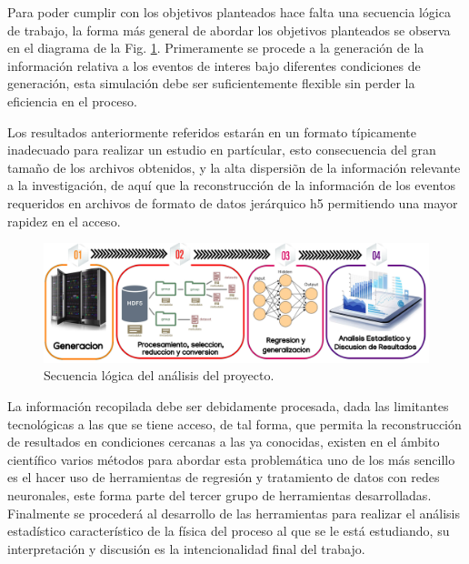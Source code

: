 Para poder cumplir con los objetivos planteados hace falta una secuencia lógica de trabajo, la forma más general de abordar los objetivos planteados se observa en el diagrama de la Fig. \ref{procesos_darksusy}. Primeramente se procede a la generación de la información relativa a los eventos de interes bajo diferentes condiciones de generación, esta simulación debe ser suficientemente flexible sin perder la eficiencia en el proceso.

Los resultados anteriormente referidos estarán en un formato típicamente inadecuado para realizar un estudio en partícular, esto consecuencia del gran tamaño de los archivos obtenidos, y la alta dispersiõn de la información relevante a la investigación, de aquí que la reconstrucción de la información de los eventos requeridos en archivos de formato de datos jerárquico h5 permitiendo una mayor rapidez en el acceso.
\begin{figure}[h]
\centering
\includegraphics[width=1\textwidth]{Simulacion/imagenes/procesos_darksusy.png}
\caption{Secuencia lógica del análisis del proyecto.}
\label{procesos_darksusy}
\end{figure}

La información recopilada debe ser debidamente procesada, dada las limitantes tecnológicas a las que se tiene acceso, de tal forma, que permita la reconstrucción de resultados en condiciones cercanas a las ya conocidas, existen en el ámbito científico varios métodos para abordar esta problemática uno de los más sencillo es el hacer uso de herramientas de regresión y tratamiento de datos con redes neuronales, este forma parte del tercer grupo de herramientas desarrolladas. Finalmente se procederá al desarrollo de las herramientas para realizar el análisis estadístico característico de la física del proceso al que se le está estudiando, su interpretación y discusión es la intencionalidad final del trabajo. 

